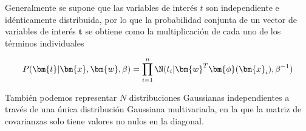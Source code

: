 % 
% 
%     
%     
%       
% 

Generalmente se supone que las variables de inter\'es $t$ son independiente e id\'enticamente distribuida, por lo que la probabilidad conjunta de un vector de variables de inter\'es $\bm{t}$ se obtiene como la multiplicaci\'on de cada uno de los t\'erminos individuales

\begin{equation}
P(\bm{t} | \bm{x}, \bm{w}, \beta) = \prod_{i=1}^n \N(t_i | \bm{w}^T \bm{\phi}(\bm{x}_i) , \beta^{-1})
\end{equation}

% 
% 
% 
%     
%     
%       

Tambi\'en podemos representar $N$ distribuciones Gaussianas independientes a trav\'es de una \'unica distribuci\'on Gaussiana multivariada, en la que la matriz de covarianzas solo tiene valores no nulos en la diagonal.

